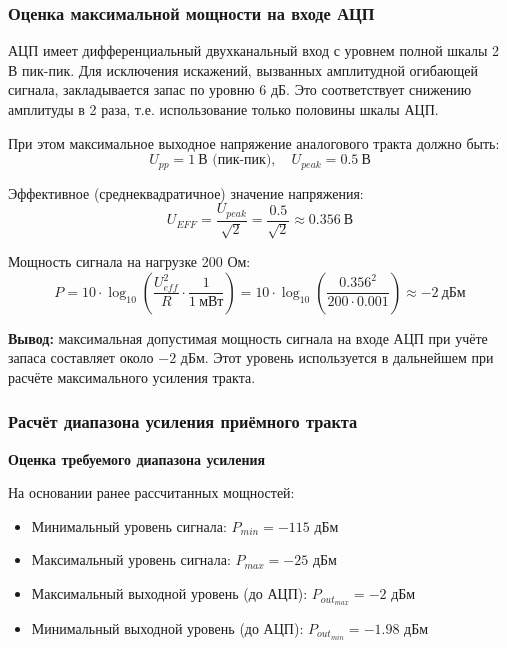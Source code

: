 \documentclass[a4paper,12pt]{article}
\begin{document}
\subsubsection{Оценка максимальной мощности на входе АЦП}
АЦП имеет дифференциальный двухканальный вход с уровнем полной шкалы 2 В пик-пик. Для исключения искажений, вызванных амплитудной огибающей сигнала, закладывается запас по уровню 6 дБ. Это соответствует снижению амплитуды в 2 раза, т.е. использование только половины шкалы АЦП.

При этом максимальное выходное напряжение аналогового тракта должно быть:
\begin{equation}
U_{pp} = 1\ \text{В (пик-пик)},\quad U_{peak} = 0.5\ \text{В}
\end{equation}

Эффективное (среднеквадратичное) значение напряжения:
\begin{equation}
    U_{EFF} = \frac{U_{peak}}{\sqrt{2}} = \frac{0.5}{\sqrt{2}} \approx 0.356\ \text{В}
\end{equation}

Мощность сигнала на нагрузке 200 Ом:
\begin{equation}
P = 10 \cdot \log_{10} \left( \frac{U_{eff}^2}{R} \cdot \frac{1}{1~\text{мВт}} \right)
= 10 \cdot \log_{10} \left( \frac{0.356^2}{200 \cdot 0.001} \right) \approx -2\ \text{дБм}
\end{equation}

\textbf{Вывод:} максимальная допустимая мощность сигнала на входе АЦП при учёте запаса составляет около $-2$ дБм. Этот уровень используется в дальнейшем при расчёте максимального усиления тракта.


\subsubsection{Расчёт диапазона усиления приёмного тракта}

\textbf{Оценка требуемого диапазона усиления}

На основании ранее рассчитанных мощностей:

\begin{itemize}
\item Минимальный уровень сигнала: $P_{min} = -115$ дБм
\item Максимальный уровень сигнала: $P_{max} = -25$ дБм
\item Максимальный выходной уровень (до АЦП): $P_{out_{max}} = -2$ дБм
\item Минимальный выходной уровень (до АЦП): $P_{out_{min}} = -1.98$ дБм
\end{itemize}
\end{document}
